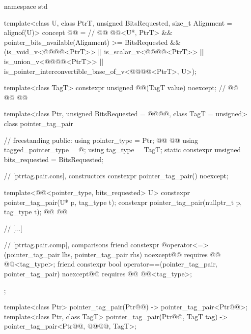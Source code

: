 \documentclass{wg21}
\begin{document}
\begin{codeblock}
namespace std {
  template<class U, class PtrT, unsigned BitsRequested, size_t Alignment = alignof(U)>
    concept @@ =                        // \expos
      @@
      @@<U*, PtrT> &&
      pointer_bits_available(Alignment) >= BitsRequested &&
      (is_void_v<@@@@<PtrT>> ||
       is_scalar_v<@@@@<PtrT>> ||
       is_union_v<@@@@<PtrT>> ||
       is_pointer_interconvertible_base_of_v<@@@@<PtrT>, U>);

  template<class TagT>
    constexpr unsigned @@(TagT value) noexcept;      // \expos
  @@
    @@              @\added{// \expos}@

  template<class Ptr, unsigned BitsRequested = @@@@,
           class TagT = unsigned>
  class pointer_tag_pair {                                      // freestanding
  public:
    using pointer_type        = Ptr;
    @@
    @@
    using tagged_pointer_type = @\seebelow@;
    using tag_type            = TagT;
    static constexpr unsigned bits_requested = BitsRequested;

    // [ptrtag.pair.cons], constructors
    constexpr pointer_tag_pair() noexcept;

    template<@@<pointer_type, bits_requested> U>
      constexpr pointer_tag_pair(U* p, tag_type t);
    constexpr pointer_tag_pair(nullptr_t p, tag_type t);
    @@
      @@

    // [...]

    // [ptrtag.pair.comp], comparisons
    friend constexpr @\seebelow@ operator<=>(pointer_tag_pair lhs, pointer_tag_pair rhs)
      noexcept@@ requires @@ @@<tag_type>;
    friend constexpr bool operator==(pointer_tag_pair, pointer_tag_pair)
      noexcept@@ requires @@ @@<tag_type>;
  };

  template<class Ptr>
    pointer_tag_pair(Ptr@\removed{*}@)
      -> pointer_tag_pair<Ptr@\removed{*}@>;
  template<class Ptr, class TagT>
    pointer_tag_pair(Ptr@\removed{*}@, TagT tag)
      -> pointer_tag_pair<Ptr@\removed{*}@, @@@@, TagT>;
}
\end{codeblock}
\end{document}
